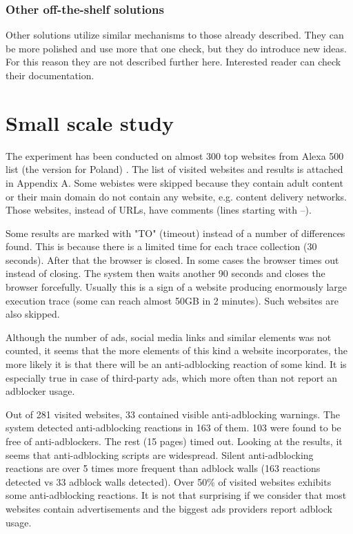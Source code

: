 \subsubsection{Other off-the-shelf solutions}
Other solutions utilize similar mechanisms to those already described.
They can be more polished and use more that one check,
but they do introduce new ideas. For this reason they are not described further here.
Interested reader can check their documentation.


\section{Small scale study}

The experiment has been conducted on almost 300 top websites from Alexa 500 list (the version for Poland) \cite{alexa-list}.
The list of visited websites and results is attached in Appendix A. Some webistes were skipped because they
contain adult content or their main domain do not contain any website, e.g. content delivery networks. 
Those websites, instead of URLs, have comments (lines starting with --).

Some results are marked with "TO" (timeout) instead of a number of differences found. This is because
there is a limited time for each trace collection (30 seconds). After that the browser is closed.
In some cases the browser times out instead of closing. The system then waits another 90 seconds and closes
the browser forcefully.
Usually this is a sign of a website producing enormously large execution trace
(some can reach almost 50GB in 2 minutes).
Such websites are also skipped.

Although the number of ads, social media links and similar elements was not counted, it seems that the more 
elements of this kind a website incorporates, the more likely it is that there will be an anti-adblocking reaction of some kind.
It is especially true in case of third-party ads, which more often than not report an adblocker usage.

Out of 281 visited websites, 33 contained visible anti-adblocking warnings. 
The system detected anti-adblocking reactions in 163 of them. 103 were found to be free of anti-adblockers.
The rest (15 pages) timed out.
Looking at the results, it seems that anti-adblocking scripts are widespread. 
Silent anti-adblocking reactions are over 5 times more frequent than adblock walls
(163 reactions detected vs 33 adblock walls detected). Over 50\% of visited websites exhibits some 
anti-adblocking reactions. It is not that surprising if we consider that most websites contain advertisements
and the biggest ads providers report adblock usage.


